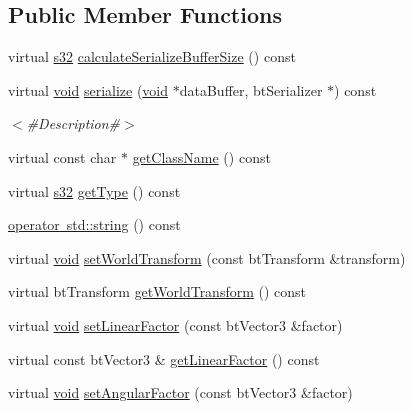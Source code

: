 \subsection*{Public Member Functions}
\begin{DoxyCompactItemize}
\item 
virtual \mbox{\hyperlink{_util_8h_aa62c75d314a0d1f37f79c4b73b2292e2}{s32}} \mbox{\hyperlink{classnjli_1_1_physics_body_rigid_a8263223fca42a563b9f2a756d077c8b1}{calculate\+Serialize\+Buffer\+Size}} () const
\item 
virtual \mbox{\hyperlink{_thread_8h_af1e856da2e658414cb2456cb6f7ebc66}{void}} \mbox{\hyperlink{classnjli_1_1_physics_body_rigid_aa2f009ffadaf78b84bd36c8cb5536f6c}{serialize}} (\mbox{\hyperlink{_thread_8h_af1e856da2e658414cb2456cb6f7ebc66}{void}} $\ast$data\+Buffer, bt\+Serializer $\ast$) const
\begin{DoxyCompactList}\small\item\em $<$\#\+Description\#$>$ \end{DoxyCompactList}\item 
virtual const char $\ast$ \mbox{\hyperlink{classnjli_1_1_physics_body_rigid_a13a8810e9ddca12e83bbbe6676e8c906}{get\+Class\+Name}} () const
\item 
virtual \mbox{\hyperlink{_util_8h_aa62c75d314a0d1f37f79c4b73b2292e2}{s32}} \mbox{\hyperlink{classnjli_1_1_physics_body_rigid_a701c7a02bd440b03982d7f9509baca03}{get\+Type}} () const
\item 
\mbox{\hyperlink{classnjli_1_1_physics_body_rigid_a6fa8e700498136a0a6f64c9c3c45eed8}{operator std\+::string}} () const
\item 
virtual \mbox{\hyperlink{_thread_8h_af1e856da2e658414cb2456cb6f7ebc66}{void}} \mbox{\hyperlink{classnjli_1_1_physics_body_rigid_a70afa1817272e87547d6fccd8ca91ff4}{set\+World\+Transform}} (const bt\+Transform \&transform)
\item 
virtual bt\+Transform \mbox{\hyperlink{classnjli_1_1_physics_body_rigid_ad65b1292303642832a18f864bb23cff5}{get\+World\+Transform}} () const
\item 
virtual \mbox{\hyperlink{_thread_8h_af1e856da2e658414cb2456cb6f7ebc66}{void}} \mbox{\hyperlink{classnjli_1_1_physics_body_rigid_a3d02fd518a3031f48f3512b8026a8a75}{set\+Linear\+Factor}} (const bt\+Vector3 \&factor)
\item 
virtual const bt\+Vector3 \& \mbox{\hyperlink{classnjli_1_1_physics_body_rigid_ae098aa8333a7f82efabd8e3945eedf87}{get\+Linear\+Factor}} () const
\item 
virtual \mbox{\hyperlink{_thread_8h_af1e856da2e658414cb2456cb6f7ebc66}{void}} \mbox{\hyperlink{classnjli_1_1_physics_body_rigid_aea1f079a7abc6817bb53ed59e816e4e9}{set\+Angular\+Factor}} (const bt\+Vector3 \&factor)

\end{DoxyCompactItemize}
